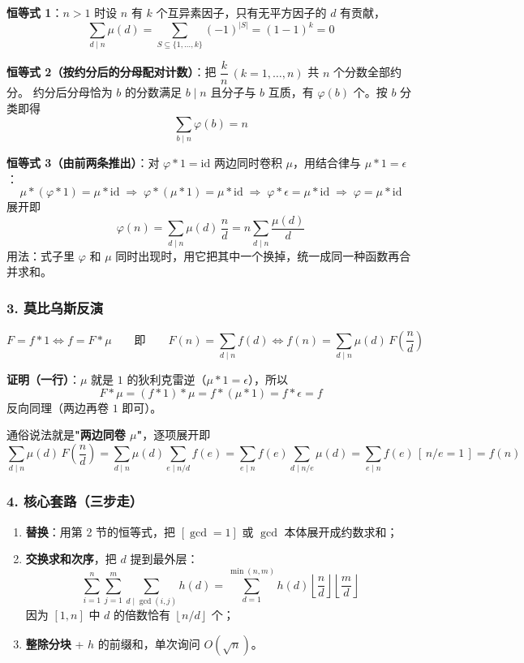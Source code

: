 \textbf{恒等式 1}：$n>1$ 时设 $n$ 有 $k$ 个互异素因子，只有无平方因子的 $d$ 有贡献，
$$\sum_{d \mid n}\mu(d) = \sum_{S \subseteq \{1,\dots,k\}}(-1)^{|S|} = (1-1)^k = 0$$

\textbf{恒等式 2（按约分后的分母配对计数）}：把 $\dfrac kn\ (k=1,\dots,n)$ 共 $n$ 个分数全部约分。
约分后分母恰为 $b$ 的分数满足 $b \mid n$ 且分子与 $b$ 互质，有 $\varphi(b)$ 个。按 $b$ 分类即得
$$\sum_{b \mid n}\varphi(b) = n$$

\textbf{恒等式 3（由前两条推出）}：对 $\varphi * 1 = \mathrm{id}$ 两边同时卷积 $\mu$，用结合律与 $\mu * 1 = \epsilon$：
$$\mu * (\varphi * 1) = \mu * \mathrm{id}
\;\Longrightarrow\; \varphi * (\mu * 1) = \mu * \mathrm{id}
\;\Longrightarrow\; \varphi * \epsilon = \mu * \mathrm{id}
\;\Longrightarrow\; \varphi = \mu * \mathrm{id}$$
展开即
$$\varphi(n) = \sum_{d \mid n}\mu(d)\,\frac nd = n\sum_{d \mid n}\frac{\mu(d)}{d}$$
用法：式子里 $\varphi$ 和 $\mu$ 同时出现时，用它把其中一个换掉，统一成同一种函数再合并求和。

\hrulefill

\subsubsection*{3. 莫比乌斯反演}

$$F = f * 1 \iff f = F * \mu
\qquad\text{即}\qquad
F(n) = \sum_{d \mid n}f(d) \iff f(n) = \sum_{d \mid n}\mu(d)\,F\!\left(\frac nd\right)$$

\textbf{证明（一行）}：$\mu$ 就是 $1$ 的狄利克雷逆（$\mu * 1 = \epsilon$），所以
$$F * \mu = (f * 1) * \mu = f * (\mu * 1) = f * \epsilon = f$$
反向同理（两边再卷 $1$ 即可）。

通俗说法就是\textbf{"两边同卷 $\mu$"}，逐项展开即
$$\sum_{d \mid n}\mu(d)\,F\!\left(\frac nd\right)
= \sum_{d \mid n}\mu(d)\sum_{e \mid n/d}f(e)
= \sum_{e \mid n}f(e)\sum_{d \mid n/e}\mu(d)
= \sum_{e \mid n}f(e)\,[\,n/e = 1\,] = f(n)$$

\hrulefill

\subsubsection*{4. 核心套路（三步走）}

\begin{enumerate}
    \item \textbf{替换}：用第 2 节的恒等式，把 $[\gcd=1]$ 或 $\gcd$ 本体展开成约数求和；
    \item \textbf{交换求和次序}，把 $d$ 提到最外层：
    $$\sum_{i=1}^{n}\sum_{j=1}^{m}\sum_{d \mid \gcd(i,j)} h(d)
    = \sum_{d=1}^{\min(n,m)} h(d)\left\lfloor \frac nd \right\rfloor\left\lfloor \frac md \right\rfloor$$
    因为 $[1,n]$ 中 $d$ 的倍数恰有 $\left\lfloor n/d \right\rfloor$ 个；
    \item \textbf{整除分块} + $h$ 的前缀和，单次询问 $O(\sqrt n)$。
\end{enumerate}

